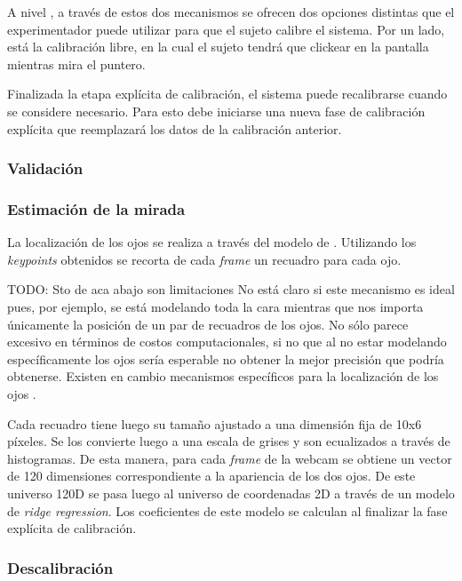 A nivel \jspsych, a través de estos dos mecanismos se ofrecen dos opciones
distintas que el experimentador puede utilizar para que el sujeto calibre el
sistema.
Por un lado, está la calibración libre, en la cual el sujeto tendrá que
clickear en la pantalla mientras mira el puntero.


Finalizada la etapa explícita de calibración, el sistema puede recalibrarse
cuando se considere necesario.
Para esto debe iniciarse una nueva fase de calibración explícita que
reemplazará los datos de la calibración anterior.

\subsubsection{Validación}

\subsubsection{Estimación de la mirada}

La localización de los ojos se realiza a través del modelo de .
Utilizando los \textit{keypoints} obtenidos se recorta de cada \textit{frame}
un recuadro para cada ojo.

TODO: Sto de aca abajo son limitaciones
No está claro si este mecanismo es ideal pues, por ejemplo, se está modelando
toda la cara mientras que nos importa únicamente la posición de un par de
recuadros de los ojos.
No sólo parece excesivo en términos de costos computacionales, si no que al no
estar modelando específicamente los ojos sería esperable no obtener la mejor
precisión que podría obtenerse.
Existen en cambio mecanismos específicos para la localización de los ojos
\cite{hansen_2009_eye_of_the_beholder}.

Cada recuadro tiene luego su tamaño ajustado a una dimensión fija de 10x6
píxeles.
Se los convierte luego a una escala de grises y son ecualizados a través de
histogramas.
De esta manera, para cada \textit{frame} de la webcam se obtiene un vector de
120 dimensiones correspondiente a la apariencia de los dos ojos.
De este universo 120D se pasa luego al universo de coordenadas 2D a través de
un modelo de \textit{ridge regression}.
Los coeficientes de este modelo se calculan al finalizar la fase explícita de
calibración.

\subsubsection{Descalibración}

